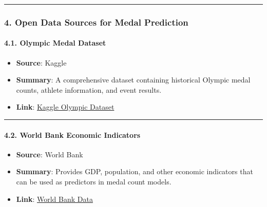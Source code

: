 \begin{enumerate}
\begin{description}
\begin{center}\rule{0.5\linewidth}{0.5pt}\end{center}

\hypertarget{open-data-sources-for-medal-prediction}{%
\subsubsection*{\texorpdfstring{\textbf{4. Open Data Sources for Medal
Prediction}}{4. Open Data Sources for Medal Prediction}}\label{open-data-sources-for-medal-prediction}}

\hypertarget{olympic-medal-dataset}{%
\paragraph{\texorpdfstring{\textbf{4.1. Olympic Medal
Dataset}}{4.1. Olympic Medal Dataset}}\label{olympic-medal-dataset}}

\begin{itemize}
\item
  \textbf{Source}: Kaggle
\item
  \textbf{Summary}: A comprehensive dataset containing historical
  Olympic medal counts, athlete information, and event results.
\item
  \textbf{Link}:
  \href{https://www.kaggle.com/datasets/heesoo37/120-years-of-olympic-history-athletes-and-results}{Kaggle
  Olympic Dataset}
\end{itemize}

\begin{center}\rule{0.5\linewidth}{0.5pt}\end{center}

\hypertarget{world-bank-economic-indicators}{%
\paragraph{\texorpdfstring{\textbf{4.2. World Bank Economic
Indicators}}{4.2. World Bank Economic Indicators}}\label{world-bank-economic-indicators}}

\begin{itemize}
\item
  \textbf{Source}: World Bank
\item
  \textbf{Summary}: Provides GDP, population, and other economic
  indicators that can be used as predictors in medal count models.
\item
  \textbf{Link}: \href{https://data.worldbank.org/}{World Bank Data}
\end{itemize}


\end{description}
\end{enumerate}
